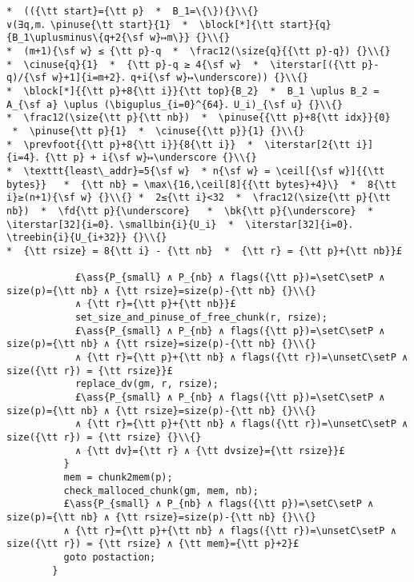 \documentclass[10pt,twoside]{report}
\makeatletter
\newcommand{\ml}[2][t]{\mbox{\mdseries\begin{tabular}[#1]{@{}L@{}}#2\end{tabular}}}
\newcommand{\ass}[1]{\ensuremath{{\color{blue}\left\{\ml[c]{#1}\right\}}}}
\renewcommand{\ceil}[2][]{\left\lceil{#2}\right\rceil_{#1}}
\newcommand{\setC}{\raisebox{1.5pt}{$\blacktriangledown$}}
\newcommand{\unsetC}{\raisebox{1.5pt}{$\triangledown$}}
\newcommand{\setP}{{\blacktriangle}}
\newcommand{\iterstar}[2][]{\text{\LARGE $*$}^{#1}_{#2}}
\makeatother
\begin{document}
\begin{lstlisting}
*  (({\tt start}={\tt p}  *  B_1=\{\}){}\\{}
∨(∃q,m．\pinuse{\tt start}{1}  *  \block[*]{\tt start}{q}{B_1\uplusminus\{q+2{\sf w}↦m\}} {}\\{}
*  (m+1){\sf w} ≤ {\tt p}-q  *  \frac12(\size{q}{{\tt p}-q}) {}\\{}
*  \cinuse{q}{1}  *  {\tt p}-q ≥ 4{\sf w}  *  \iterstar[({\tt p}-q)/{\sf w}+1]{i=m+2}．q+i{\sf w}↦\underscore)) {}\\{}
*  \block[*]{{\tt p}+8{\tt i}}{\tt top}{B_2}  *  B_1 \uplus B_2 = A_{\sf a} \uplus (\biguplus_{i=0}^{64}．U_i)_{\sf u} {}\\{}
*  \frac12(\size{\tt p}{\tt nb})  *  \pinuse{{\tt p}+8{\tt idx}}{0}  *  \pinuse{\tt p}{1}  *  \cinuse{{\tt p}}{1} {}\\{}
*  \prevfoot{{\tt p}+8{\tt i}}{8{\tt i}}  *  \iterstar[2{\tt i}]{i=4}．{\tt p} + i{\sf w}↦\underscore {}\\{}
*  \texttt{least\_addr}=5{\sf w}  * n{\sf w} = \ceil[{\sf w}]{{\tt bytes}}   *  {\tt nb} = \max\{16,\ceil[8]{{\tt bytes}+4}\}  *  8{\tt i}≥(n+1){\sf w} {}\\{} *  2≤{\tt i}<32  *  \frac12(\size{\tt p}{\tt nb})  *  \fd{\tt p}{\underscore}   *  \bk{\tt p}{\underscore}  *  \iterstar[32]{i=0}．\smallbin{i}{U_i}  *  \iterstar[32]{i=0}．\treebin{i}{U_{i+32}} {}\\{}
*  {\tt rsize} = 8{\tt i} - {\tt nb}  *  {\tt r} = {\tt p}+{\tt nb}}£

            £\ass{P_{small} ∧ P_{nb} ∧ flags({\tt p})=\setC\setP ∧ size(p)={\tt nb} ∧ {\tt rsize}=size(p)-{\tt nb} {}\\{}
            ∧ {\tt r}={\tt p}+{\tt nb}}£
            set_size_and_pinuse_of_free_chunk(r, rsize);
            £\ass{P_{small} ∧ P_{nb} ∧ flags({\tt p})=\setC\setP ∧ size(p)={\tt nb} ∧ {\tt rsize}=size(p)-{\tt nb} {}\\{} 
            ∧ {\tt r}={\tt p}+{\tt nb} ∧ flags({\tt r})=\unsetC\setP ∧ size({\tt r}) = {\tt rsize}}£
            replace_dv(gm, r, rsize);
            £\ass{P_{small} ∧ P_{nb} ∧ flags({\tt p})=\setC\setP ∧ size(p)={\tt nb} ∧ {\tt rsize}=size(p)-{\tt nb} {}\\{} 
            ∧ {\tt r}={\tt p}+{\tt nb} ∧ flags({\tt r})=\unsetC\setP ∧ size({\tt r}) = {\tt rsize} {}\\{}
            ∧ {\tt dv}={\tt r} ∧ {\tt dvsize}={\tt rsize}}£
          }
          mem = chunk2mem(p);
          check_malloced_chunk(gm, mem, nb);
          £\ass{P_{small} ∧ P_{nb} ∧ flags({\tt p})=\setC\setP ∧ size(p)={\tt nb} ∧ {\tt rsize}=size(p)-{\tt nb} {}\\{} 
          ∧ {\tt r}={\tt p}+{\tt nb} ∧ flags({\tt r})=\unsetC\setP ∧ size({\tt r}) = {\tt rsize} ∧ {\tt mem}={\tt p}+2}£
          goto postaction;
        }
\end{lstlisting}
\end{document}

